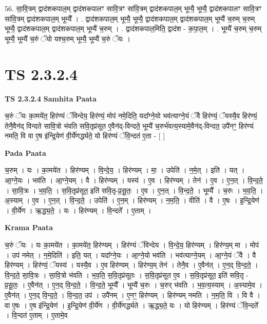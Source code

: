 \documentclass[17pt]{extarticle}
\begin{document}
56. सा॒वि॒त्रम् द्वाद॑शकपाल॒म् द्वाद॑शकपालꣳ सावि॒त्रꣳ सा॑वि॒त्रम् द्वाद॑शकपाल॒म् भूम्यै॒ भूम्यै॒ द्वाद॑शकपालꣳ सावि॒त्रꣳ सा॑वि॒त्रम् द्वाद॑शकपाल॒म् भूम्यै᳚ । . द्वाद॑शकपाल॒म् भूम्यै॒ भूम्यै॒ द्वाद॑शकपाल॒म् द्वाद॑शकपाल॒म् भूम्यै॑ च॒रुम् च॒रुम् भूम्यै॒ द्वाद॑शकपाल॒म् द्वाद॑शकपाल॒म् भूम्यै॑ च॒रुम् । . द्वाद॑शकपाल॒मिति॒ द्वाद॑श - क॒पा॒ल॒म् । . भूम्यै॑ च॒रुम् च॒रुम् भूम्यै॒ भूम्यै॑ च॒रुं ॅयो यश्च॒रुम् भूम्यै॒ भूम्यै॑ च॒रुं ॅयः । \newline
\pagebreak
{}

\section{ TS 2.3.2.4 }

\textbf{TS 2.3.2.4 } \newline
\textbf{Samhita Paata} \newline

च॒रुं ॅयः का॒मये॑त॒ हिर॑ण्यं ॅविन्देय॒ हिर॑ण्यं॒ मोप॑ नमे॒दिति॒ यदा᳚ग्ने॒यो भव॑त्याग्ने॒यं ॅवै हिर॑ण्यं॒ ॅयस्यै॒व हिर॑ण्यं॒ तेनै॒वैन॑द् विन्दते सावि॒त्रो भ॑वति सवि॒तृप्र॑सूत ए॒वैन॑द्-विन्दते॒ भूम्यै॑ च॒रुर्भ॑वत्य॒स्यामे॒वैन॑द्-विन्दत॒ उपै॑नꣳ॒॒ हिर॑ण्यं नमति॒ वि वा ए॒ष इ॑न्द्रि॒येण॑ वी॒र्ये॑णर्द्ध्यते॒ यो हिर॑ण्यं ॅवि॒न्दत॑ ए॒ता - [  ] \newline

\textbf{Pada Paata} \newline

च॒रुम् । यः । का॒मये॑त । हिर॑ण्यम् । वि॒न्दे॒य॒ । हिर॑ण्यम् । मा॒ । उपेति॑ । न॒मे॒त् । इति॑ । यत् । आ॒ग्ने॒यः । भव॑ति । आ॒ग्ने॒यम् । वै । हिर॑ण्यम् । यस्य॑ । ए॒व । हिर॑ण्यम् । तेन॑ । ए॒व । ए॒न॒त् । वि॒न्द॒ते॒ । सा॒वि॒त्रः । भ॒व॒ति॒ । स॒वि॒तृप्र॑सूत॒ इति॑ सवि॒तृ-प्र॒सू॒तः॒ । ए॒व । ए॒न॒त् । वि॒न्द॒ते॒ । भूम्यै᳚ । च॒रुः । भ॒व॒ति॒ । अ॒स्याम् । ए॒व । ए॒न॒त् । वि॒न्द॒ते॒ । उपेति॑ । ए॒न॒म् । हिर॑ण्यम् । न॒म॒ति॒ । वीति॑ । वै । ए॒षः । इ॒न्द्रि॒येण॑ । वी॒र्ये॑ण । ऋ॒द्ध्य॒ते॒ । यः । हिर॑ण्यम् । वि॒न्दते᳚ । ए॒ताम् ।  \newline


\textbf{Krama Paata} \newline

च॒रुं ॅयः । यः का॒मये॑त । का॒मये॑त॒ हिर॑ण्यम् । हिर॑ण्यं ॅविन्देय । वि॒न्दे॒य॒ हिर॑ण्यम् । हिर॑ण्य॒म् मा । मोप॑ । उप॑ नमेत् । न॒मे॒दिति॑ । इति॒ यत् । यदा᳚ग्ने॒यः । आ॒ग्ने॒यो भव॑ति । भव॑त्याग्ने॒यम् । आ॒ग्ने॒यं ॅवै । वै हिर॑ण्यम् । हिर॑ण्यं॒ ॅयस्य॑ । यस्यै॒व । ए॒व हिर॑ण्यम् । हिर॑ण्य॒म् तेन॑ । तेनै॒व । ए॒वैन॑त् । ए॒न॒द् वि॒न्द॒ते॒ । वि॒न्द॒ते॒ सा॒वि॒त्रः । सा॒वि॒त्रो भ॑वति । भ॒व॒ति॒ स॒वि॒तृप्र॑सूतः । स॒वि॒तृप्र॑सूत ए॒व । स॒वि॒तृप्र॑सूत॒ इति॑ सवि॒तृ - प्र॒सू॒तः॒ । ए॒वैन॑त् । ए॒न॒द् वि॒न्द॒ते॒ । वि॒न्द॒ते॒ भूम्यै᳚ । भूम्यै॑ च॒रुः । च॒रुर् भ॑वति । भ॒व॒त्य॒स्याम् । अ॒स्यामे॒व । ए॒वैन॑त् । ए॒न॒द् वि॒न्द॒ते॒ । वि॒न्द॒त॒ उप॑ । उपै॑नम् । ए॒नꣳ॒॒ हिर॑ण्यम् । हिर॑ण्यम् नमति । न॒म॒ति॒ वि । वि वै । वा ए॒षः । ए॒ष इ॑न्द्रि॒येण॑ । इ॒न्द्रि॒येण॑ वी॒र्ये॑ण । वी॒र्ये॑णर्द्ध्यते । ऋ॒द्ध्य॒ते॒ यः । यो हिर॑ण्यम् । हिर॑ण्यं ॅवि॒न्दते᳚ । वि॒न्दत॑ ए॒ताम् । ए॒तामे॒व \newline
\end{document}
